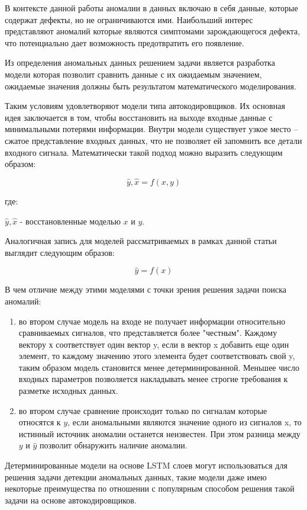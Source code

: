 \documentclass[12pt,a4paper]{article}
\begin{document}
В контексте данной работы аномалии в данных включаю в себя данные, которые содержат дефекты, но не ограничиваются ими. Наибольший интерес представляют аномалий которые  являются симптомами зарождающегося дефекта, что потенциально дает возможность предотвратить его появление.

Из определения аномальных данных решением задачи является разработка модели которая позволит сравнить данные с их ожидаемым значением, ожидаемые значения должны быть результатом математического моделирования.

Таким условиям удовлетворяют модели типа автокодировщиков. Их основная идея заключается в том, чтобы восстановить на выходе входные данные с минимальными потерями информации. Внутри модели существует узкое место – сжатое представление входных данных, что не позволяет ей запомнить все детали входного сигнала. Математически такой подход можно выразить следующим образом:

$$\hat{y},\hat{x} = f(x,y)$$

где: 


$\hat{y},\hat{x}$ - восстановленные моделью $x$ и $y$.

Аналогичная запись для моделей рассматриваемых в рамках данной статьи выглядит следующим образов:

$$\hat{y} = f(x)$$

В чем отличие между этими моделями с точки зрения решения задачи поиска аномалий:
\begin{enumerate}
	\item во втором случае модель на входе не получает информации относительно сравниваемых сигналов, что представляется более "честным". Каждому вектору х соответствует один вектор y, если в вектор x добавить еще один элемент, то каждому значению этого элемента будет соответствовать свой y, таким образом модель становится менее детерминированной. Меньшее число входных параметров позволяется накладывать менее строгие требования к разметке исходных данных.
	\item во втором случае сравнение происходит только по сигналам которые относятся к $y$, если аномальными являются значение одного из сигналов x, то истинный источник аномалии останется неизвестен. При этом разница между $y$ и $\hat{y}$ позволит обнаружить наличие аномалии.
\end{enumerate}

Детерминированные модели на основе LSTM слоев могут использоваться для решения задачи детекции аномальных данных, такие модели даже имею некоторые преимущества по отношении с популярным способом решения такой задачи на основе автокодировщиков.
\end{document}
